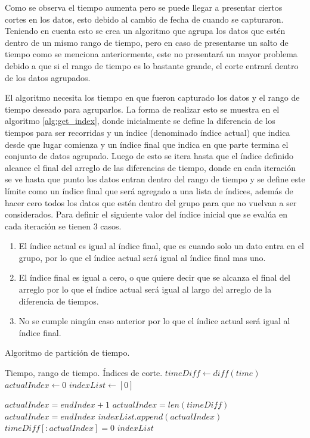 Como se observa el tiempo aumenta pero se puede llegar a presentar ciertos cortes en los datos, esto debido al cambio de fecha de cuando se capturaron. Teniendo en cuenta esto se crea un algoritmo que agrupa los datos que estén dentro de un mismo rango de tiempo, pero en caso de presentarse un salto de tiempo como se menciona anteriormente, este no presentará un mayor problema debido a que si el rango de tiempo es lo bastante grande, el corte entrará dentro de los datos agrupados. 

El algoritmo necesita los tiempo en que fueron capturado los datos y el rango de tiempo deseado para agruparlos. La forma de realizar esto se muestra en el algoritmo \ref{alg:get_index}, donde inicialmente se define la diferencia de los tiempos para ser recorridas y un índice (denominado índice actual) que indica desde que lugar comienza y un índice final que indica en que parte termina el conjunto de datos agrupado. Luego de esto se itera hasta que el índice definido alcance el final del arreglo de las diferencias de tiempo, donde en cada iteración se ve hasta que punto los datos entran dentro del rango de tiempo y se define este límite como un índice final que será agregado a una lista de índices, además de hacer cero todos los datos que estén dentro del grupo para que no vuelvan a ser considerados. Para definir el siguiente valor del índice inicial que se evalúa en cada iteración se tienen 3 casos.

\begin{enumerate}
    \item El índice actual es igual al índice final, que es cuando solo un dato entra en el grupo, por lo que el índice actual será igual al índice final mas uno. 
    \item El índice final es igual a cero, o que quiere decir que se alcanza el final del arreglo por lo que el índice actual será igual al largo del arreglo de la diferencia de tiempos. 
    \item No se cumple ningún caso anterior por lo que el índice actual será igual al índice final. 
\end{enumerate}


\begin{algorithm}[!ht]
	\caption{Algoritmo de partición de tiempo.}
	\label{alg:get_index}
	\begin{algorithmic}[1]
	\REQUIRE Tiempo, rango de tiempo.
	\ENSURE Índices de corte. 	
	\STATE $timeDiff \gets diff(time)$
        \STATE $actualIndex  \gets 0$
        \STATE $indexList \gets [0]$

                \STATE $actualIndex = endIndex + 1$
                \STATE $actualIndex = len(timeDiff)$
            \ELSE
                \STATE $actualIndex = endIndex$
            \ENDIF   
            \STATE $indexList.append(actualIndex)$
            \STATE $timeDiff[:actualIndex] = 0$
        \ENDWHILE 
	\RETURN $indexList$
	
	\end{algorithmic}
\end{algorithm}

